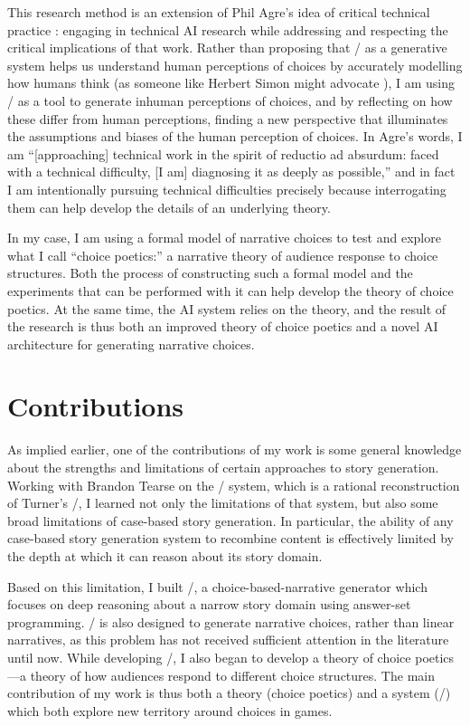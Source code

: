 This research method is an extension of Phil Agre's idea of critical technical practice \citep{Agre1997}: engaging in technical AI research while addressing and respecting the critical implications of that work.
%
Rather than proposing that \dunyazad/ as a generative system helps us understand human perceptions of choices by accurately modelling how humans think (as someone like Herbert Simon might advocate \citep{Simon2006}), I am using \dunyazad/ as a tool to generate inhuman perceptions of choices, and by reflecting on how these differ from human perceptions, finding a new perspective that illuminates the assumptions and biases of the human perception of choices.
%
In Agre's words, I am ``[approaching] technical work in the spirit of reductio ad absurdum: faced with a technical difficulty, [I am] diagnosing it as deeply as possible,'' \citep{Agre1997} and in fact I am intentionally pursuing technical difficulties precisely because interrogating them can help develop the details of an underlying theory.


In my case, I am using a formal model of narrative choices to test and explore what I call ``choice poetics:'' a narrative theory of audience response to choice structures.
%
Both the process of constructing such a formal model and the experiments that can be performed with it can help develop the theory of choice poetics.
%
At the same time, the AI system relies on the theory, and the result of the research is thus both an improved theory of choice poetics and a novel AI architecture for generating narrative choices.


\section{Contributions}

As implied earlier, one of the contributions of my work is some general knowledge about the strengths and limitations of certain approaches to story generation.
%
Working with Brandon Tearse on the \skald/ system, which is a rational reconstruction of Turner's \minstrel/, I learned not only the limitations of that system, but also some broad limitations of case-based story generation.
%
In particular, the ability of any case-based story generation system to recombine content is effectively limited by the depth at which it can reason about its story domain.


Based on this limitation, I built \dunyazad/, a choice-based-narrative generator which focuses on deep reasoning about a narrow story domain using answer-set programming.
%
\dunyazad/ is also designed to generate narrative choices, rather than linear narratives, as this problem has not received sufficient attention in the literature until now.
%
While developing \dunyazad/, I also began to develop a theory of choice poetics---a theory of how audiences respond to different choice structures.
%
The main contribution of my work is thus both a theory (choice poetics) and a system (\dunyazad/) which both explore new territory around choices in games.


